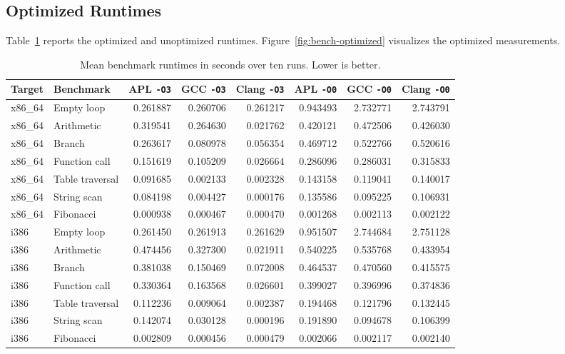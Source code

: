 \documentclass[10pt,twocolumn]{article}
\begin{document}
\subsection{Optimized Runtimes}

\par Table~\ref{tab:benchmarks} reports the optimized and unoptimized runtimes. Figure~\ref{fig:bench-optimized} visualizes the optimized measurements.

\begin{table}[t]
\centering
\scriptsize
\caption{Mean benchmark runtimes in seconds over ten runs. Lower is better.}
\label{tab:benchmarks}
\begin{tabular}{llrrrrrr}
    \toprule
    Target & Benchmark & APL \texttt{-O3} & GCC \texttt{-O3} & Clang \texttt{-O3} & APL \texttt{-O0} & GCC \texttt{-O0} & Clang \texttt{-O0} \\
    \midrule
    x86\_64 & Empty loop       & 0.261887 & 0.260706 & 0.261217 & 0.943493 & 2.732771 & 2.743791 \\
    x86\_64 & Arithmetic       & 0.319541 & 0.264630 & 0.021762 & 0.420121 & 0.472506 & 0.426030 \\
    x86\_64 & Branch           & 0.263617 & 0.080978 & 0.056354 & 0.469712 & 0.522766 & 0.520616 \\
    x86\_64 & Function call    & 0.151619 & 0.105209 & 0.026664 & 0.286096 & 0.286031 & 0.315833 \\
    x86\_64 & Table traversal  & 0.091685 & 0.002133 & 0.002328 & 0.143158 & 0.119041 & 0.140017 \\
    x86\_64 & String scan      & 0.084198 & 0.004427 & 0.000176 & 0.135586 & 0.095225 & 0.106931 \\
    x86\_64 & Fibonacci        & 0.000938 & 0.000467 & 0.000470 & 0.001268 & 0.002113 & 0.002122 \\
    i386 & Empty loop       & 0.261450 & 0.261913 & 0.261629 & 0.951507 & 2.744684 & 2.751128 \\
    i386 & Arithmetic       & 0.474456 & 0.327300 & 0.021911 & 0.540225 & 0.535768 & 0.433954 \\
    i386 & Branch           & 0.381038 & 0.150469 & 0.072008 & 0.464537 & 0.470560 & 0.415575 \\
    i386 & Function call    & 0.330364 & 0.163568 & 0.026601 & 0.399027 & 0.396996 & 0.374836 \\
    i386 & Table traversal  & 0.112236 & 0.009064 & 0.002387 & 0.194468 & 0.121796 & 0.132445 \\
    i386 & String scan      & 0.142074 & 0.030128 & 0.000196 & 0.191890 & 0.094678 & 0.106399 \\
    i386 & Fibonacci        & 0.002809 & 0.000456 & 0.000479 & 0.002066 & 0.002117 & 0.002140 \\
    \bottomrule
\end{tabular}
\end{table}
\end{document}
